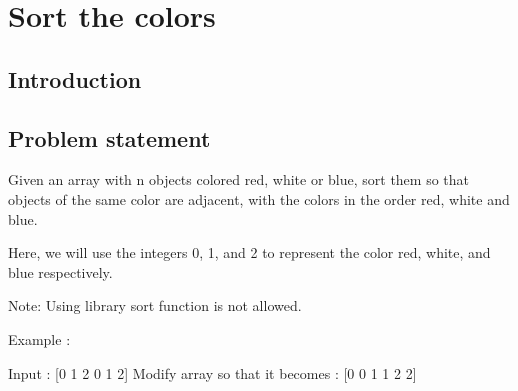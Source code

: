 %



\chapter{Sort the colors}
\label{ch:sort_colors}
\section*{Introduction}

\section{Problem statement}
\begin{exercise}
\label{example:sort_colors:exercice1}
Given an array with n objects colored red, white or blue,
sort them so that objects of the same color are adjacent, with the colors in the order red, white and blue.

Here, we will use the integers 0, 1, and 2 to represent the color red, white, and blue respectively.

Note: Using library sort function is not allowed.

Example :

Input : [0 1 2 0 1 2]
Modify array so that it becomes : [0 0 1 1 2 2]
	\begin{example}
		\label{example:sort_colors:example1}
		\hfill \
	}
		
	\end{example}

	\begin{example}
		\label{example:sort_colors:example2}
		\hfill \
		
	\end{example}

	\begin{example}
		\hfill \
	
	\label{ex:sort_colors:example3}
	\end{example}

	\begin{example}
		\hfill \

	\label{ex:sort_colors:example4}	
	\end{example}
\end{exercise}

